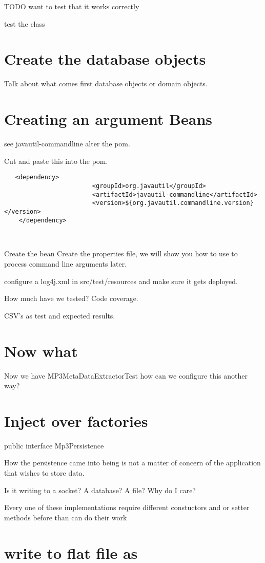 \documentclass[a4paper,10pt]{book}
\begin{document}
TODO want to test that it works correctly

test the class

\section{Create the database objects}
Talk about what comes first database objects or domain objects.

\section{Creating an argument Beans}
see javautil-commandline
alter the pom.

Cut and paste this into the pom.
\begin{verbatim}
   <dependency>
                        <groupId>org.javautil</groupId>
                        <artifactId>javautil-commandline</artifactId>
                        <version>${org.javautil.commandline.version}</version>
    </dependency>



\end{verbatim}
Create the bean
Create the properties file, we will show you how to use to process command line arguments later.

configure a log4j.xml in src/test/resources and make sure it gets deployed.

How much have we tested?  Code coverage.

CSV's as test and expected results.

\section{Now what}
Now we have MP3MetaDataExtractorTest how can we configure this another way?

\section{Inject over factories}
public interface Mp3Persistence

How the persistence came into being is not a matter of concern of the application that wishes to store data.

Is it writing to a socket? A database? A file?  Why do I care?

Every one of these implementations require different constuctors 
and or setter methods before than can do their work

\section{write to flat file as }
\end{document}
